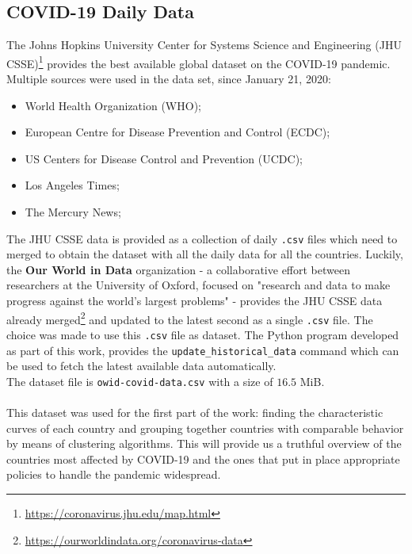 \documentclass[11pt,a4paper]{article}
\begin{document}
\subsection{COVID-19 Daily Data}
The Johns Hopkins University Center for Systems Science and Engineering
(JHU CSSE)\footnote{\url{https://coronavirus.jhu.edu/map.html}} provides the
best available global dataset on the COVID-19 pandemic. Multiple sources were
used in the data set, since January 21, 2020:
\begin{itemize}
    \item World Health Organization (WHO);
    \item European Centre for Disease Prevention and Control (ECDC);
    \item US Centers for Disease Control and Prevention (UCDC);
    \item Los Angeles Times;
    \item The Mercury News;
\end{itemize}
The JHU CSSE data is provided as a collection of daily \texttt{.csv} files which
need to merged to obtain the dataset with all the daily data for all the
countries. Luckily, the \textbf{Our World in Data} organization - a
collaborative effort between researchers at the University of Oxford, focused on
"research and data to make progress against the world's largest problems" -
provides the JHU CSSE data already
merged\footnote{\url{https://ourworldindata.org/coronavirus-data}} and updated
to the latest second as a single \texttt{.csv} file. The choice was made to use
this \texttt{.csv} file as dataset. The Python program developed as part of this
work, provides the \texttt{update\_historical\_data} command which can be used
to fetch the latest available data automatically.\\
The dataset file is \texttt{owid-covid-data.csv} with a size of $16.5$ MiB.\\
\\
This dataset was used for the first part of the work: finding the characteristic
curves of each country and grouping together countries with comparable behavior
by means of clustering algorithms. This will provide us a truthful overview of
the countries most affected by COVID-19 and the ones that put in place
appropriate policies to handle the pandemic widespread.
\end{document}
